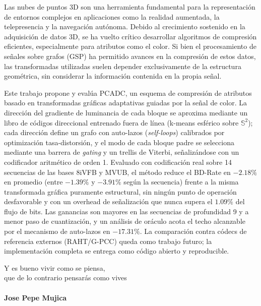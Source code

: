 \documentclass[
	spanish, %
	letterpaper, oneside
]{book}
\begin{document}
\templatePortrait

\templatePagecfg

\begin{abstractd}
Las nubes de puntos 3D son una herramienta fundamental para la representación de entornos complejos en aplicaciones como la realidad aumentada, la telepresencia y la navegación autónoma. Debido al crecimiento sostenido en la adquisición de datos 3D, se ha vuelto crítico desarrollar algoritmos de compresión eficientes, especialmente para atributos como el color. Si bien el procesamiento de señales sobre grafos (GSP) ha permitido avances en la compresión de estos datos, las transformadas utilizadas suelen depender exclusivamente de la estructura geométrica, sin considerar la información contenida en la propia señal.

Este trabajo propone y evalúa PCADC, un esquema de compresión de atributos basado en transformadas gráficas adaptativas guiadas por la señal de color. La dirección del gradiente de luminancia de cada bloque se aproxima mediante un libro de códigos direccional entrenado fuera de línea (k-means esférico sobre $\mathbb{S}^2$); cada dirección define un grafo con auto-lazos (\textit{self-loops}) calibrados por optimización tasa-distorsión, y el modo de cada bloque padre se selecciona mediante una barrera de \textit{gating} y un trellis de Viterbi, señalizándose con un codificador aritmético de orden 1. Evaluado con codificación real sobre 14 secuencias de las bases 8iVFB y MVUB, el método reduce el BD-Rate en $-2.18\%$ en promedio (entre $-1.39\%$ y $-3.91\%$ según la secuencia) frente a la misma transformada gráfica puramente estructural, sin ningún punto de operación desfavorable y con un overhead de señalización que nunca supera el $1.09\%$ del flujo de bits. Las ganancias son mayores en las secuencias de profundidad 9 y a menor paso de cuantización, y un análisis de oráculo acota el techo alcanzable por el mecanismo de auto-lazos en $-17.31\%$. La comparación contra códecs de referencia externos (RAHT/G-PCC) queda como trabajo futuro; la implementación completa se entrega como código abierto y reproducible.
    
\end{abstractd}

\begin{dedicatory}
    Y es bueno vivir como se piensa, \\
    que de lo contrario pensarás como vives \\
	~ \\
	\textbf{Jose Pepe Mujica}
\end{dedicatory}
\end{document}
